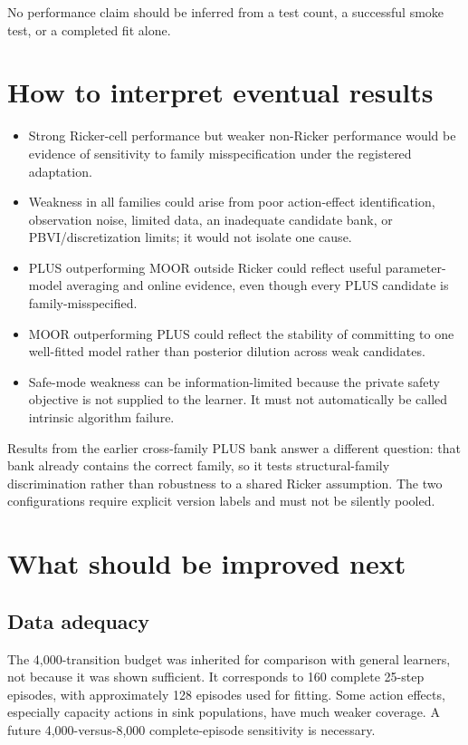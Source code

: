 \documentclass[11pt]{article}
\begin{document}
No performance claim should be inferred from a test count, a successful smoke test, or a completed
fit alone.

\section{How to interpret eventual results}

\begin{itemize}
  \item Strong Ricker-cell performance but weaker non-Ricker performance would be evidence of
  sensitivity to family misspecification under the registered adaptation.
  \item Weakness in all families could arise from poor action-effect identification, observation
  noise, limited data, an inadequate candidate bank, or PBVI/discretization limits; it would not
  isolate one cause.
  \item PLUS outperforming MOOR outside Ricker could reflect useful parameter-model averaging and
  online evidence, even though every PLUS candidate is family-misspecified.
  \item MOOR outperforming PLUS could reflect the stability of committing to one well-fitted model
  rather than posterior dilution across weak candidates.
  \item Safe-mode weakness can be information-limited because the private safety objective is not
  supplied to the learner. It must not automatically be called intrinsic algorithm failure.
\end{itemize}

Results from the earlier cross-family PLUS bank answer a different question: that bank already
contains the correct family, so it tests structural-family discrimination rather than robustness to
a shared Ricker assumption. The two configurations require explicit version labels and must not be
silently pooled.

\section{What should be improved next}

\subsection{Data adequacy}

The 4,000-transition budget was inherited for comparison with general learners, not because it was
shown sufficient. It corresponds to 160 complete 25-step episodes, with approximately 128 episodes
used for fitting. Some action effects, especially capacity actions in sink populations, have much
weaker coverage. A future 4,000-versus-8,000 complete-episode sensitivity is necessary.
\end{document}
